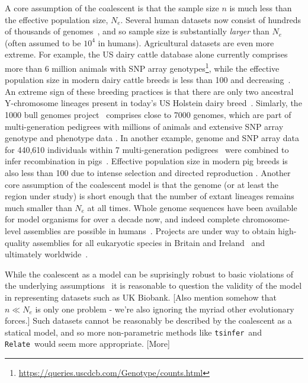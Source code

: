 \documentclass{article}
\newcommand{\tsinfer}[0]{\texttt{tsinfer}}
\newcommand{\relate}[0]{\texttt{Relate}}
\begin{document}
A core assumption of the coalescent is that the sample size $n$
is much less than the effective population size, $N_e$.
Several human datasets now consist of hundreds of thousands of
genomes~\citep{bycroft2018genome,karczewski2020mutational,tanjo2021practical},
and so sample size is substantially \emph{larger} than $N_e$
(often assumed to be $10^4$ in humans).
Agricultural datasets are even more extreme.
For example,
the US dairy cattle database alone currently comprises more than 6 million
animals with SNP array
genotypes\footnote{\url{https://queries.uscdcb.com/Genotype/counts.html}},
while the effective population size in modern dairy cattle breeds is
less than 100 and decreasing~\citep{MacLeod2013,Makanjuola2020}.
An extreme sign of these breeding practices is that there are only two ancestral
Y-chromosome lineages present in today's US Holstein dairy breed~\citep{Yue2015}.
Simlarly, the 1000 bull genomes project~\citep{hayes20191000}
comprises close to 7000 genomes, which are part of multi-generation pedigrees
with millions of animals and extensive SNP array genotype and phenotype
data \citep[e.g.][]{Cesarani2022}.
In another example, genome and SNP array data for 440,610 individuals within
7 multi-generation pedigrees~\citep{whalen2018,Johnsson2021,Ros-Freixedes2020}
were combined to infer recombination in pigs~\citep{RosFreixedes2022}.
Effective population size in modern pig breeds is also less than 100 due to
intense selection and directed reproduction \citep{Hall2016,Porcnic2016}.
Another core assumption of the coalescent model is that the genome (or
at least the region under study) is short enough that the number of extant
lineages remains much smaller than $N_e$ at all times. Whole
genome sequences have been available for model organisms
for over a decade now, %
and indeed complete chromosome-level assemblies are possible
in humans~\citep{miga2020telomere}.
Projects are under way to obtain high-quality assemblies
for all eukaryotic species in Britain and Ireland~\citep{darwin2022sequence}
and ultimately worldwide~\citep{lewin2022earth}.

While the coalescent as a model can be suprisingly robust to
basic violations of the underlying assumptions~\citep{
wakeley2012gene,bhaskar2014distortion,nelson2020accounting}
it is reasonable to question the validity of the model in
representing datasets such as UK Biobank.
[Also mention somehow that $n\ll N_e$ is only one problem -
we're also ignoring the myriad other evolutionary forces.]
Such datasets cannot be reasonably be described by
the coalescent as a statical model, and so more non-parametric
methods like \tsinfer\ and \relate\ would seem more appropriate.
[More]
\end{document}
